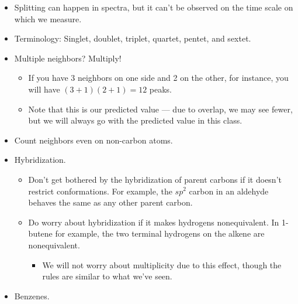 \documentclass[../notes.tex]{subfiles}
\begin{document}
\begin{itemize}
    \item Splitting can happen in  spectra, but it can't be observed on the time scale on which we measure.
    \item Terminology: Singlet, doublet, triplet, quartet, pentet, and sextet.
    \item Multiple neighbors? Multiply!
    \begin{itemize}
        \item If you have 3 neighbors on one side and 2 on the other, for instance, you will have $(3+1)(2+1)=12$ peaks.
        \item Note that this is our predicted value --- due to overlap, we may see fewer, but we will always go with the predicted value in this class.
    \end{itemize}
    \item Count neighbors even on non-carbon atoms.
    \item Hybridization.
    \begin{itemize}
        \item Don't get bothered by the hybridization of parent carbons if it doesn't restrict conformations. For example, the $sp^2$ carbon in an aldehyde behaves the same as any other parent carbon.
        \item Do worry about hybridization if it makes hydrogens nonequivalent. In 1-butene for example, the two terminal hydrogens on the alkene are nonequivalent.
        \begin{itemize}
            \item We will not worry about multiplicity due to this effect, though the rules are similar to what we've seen.
        \end{itemize}
    \end{itemize}
    \item Benzenes.
    \begin{figure}[h!]
        \centering
        \footnotesize
        \begin{subfigure}[b]{0.2\linewidth}
            \centering
            \\[1em]
            \caption{}
            \label{fig:benzeneH1NMRa}
        \end{subfigure}
        \begin{subfigure}[b]{0.2\linewidth}
            \centering
            \\[1em]
\end{subfigure}
\end{figure}
\end{itemize}
\end{document}
